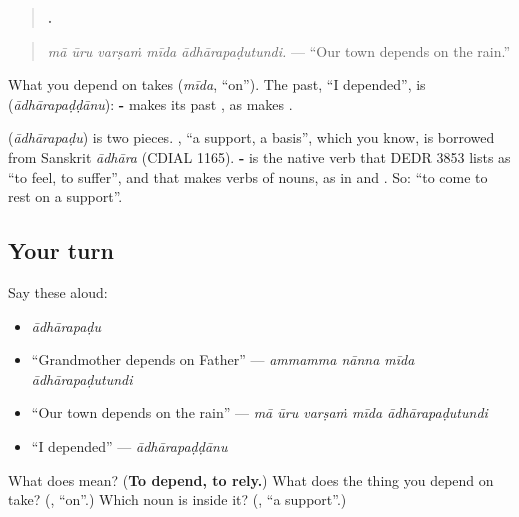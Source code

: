 \begin{quote}
\textbf{    .}
\end{quote}

\begin{quote}
\emph{mā ūru varṣaṁ mīda ādhārapaḍutundi.} — \textquotedblleft{}Our town depends on the rain.\textquotedblright{}
\end{quote}

What you depend on takes \textbf{} (\emph{mīda}, \textquotedblleft{}on\textquotedblright{}). The past, \textquotedblleft{}I depended\textquotedblright{}, is \textbf{} (\emph{ādhārapaḍḍānu}): \textbf{-} makes its past \textbf{}, as \textbf{} makes \textbf{}.

\begin{cousinweb}
\textbf{} (\emph{ādhārapaḍu}) is two pieces. \textbf{}, \textquotedblleft{}a support, a basis\textquotedblright{}, which you know, is borrowed from Sanskrit \emph{ādhāra} (CDIAL 1165). \textbf{-} is the native verb that DEDR 3853 lists as \textquotedblleft{}to feel, to suffer\textquotedblright{}, and that makes verbs of nouns, as in \textbf{} and \textbf{}. So: \textquotedblleft{}to come to rest on a support\textquotedblright{}.
\end{cousinweb}

\subsection*{Your turn}
Say these aloud:

\begin{itemize}
\raggedright
  \item \emph{ādhārapaḍu}
  \item \textquotedblleft{}Grandmother depends on Father\textquotedblright{} — \emph{ammamma nānna mīda ādhārapaḍutundi}
  \item \textquotedblleft{}Our town depends on the rain\textquotedblright{} — \emph{mā ūru varṣaṁ mīda ādhārapaḍutundi}
  \item \textquotedblleft{}I depended\textquotedblright{} — \emph{ādhārapaḍḍānu}
\end{itemize}

\begin{tcolorbox}[breakable,colback=teal!4,colframe=teal!35!black,title={Before you move on}]
What does \textbf{} mean? (\textbf{To depend, to rely.}) What does the thing you depend on take? (\textbf{}, \textquotedblleft{}on\textquotedblright{}.) Which noun is inside it? (\textbf{}, \textquotedblleft{}a support\textquotedblright{}.)
\end{tcolorbox}
